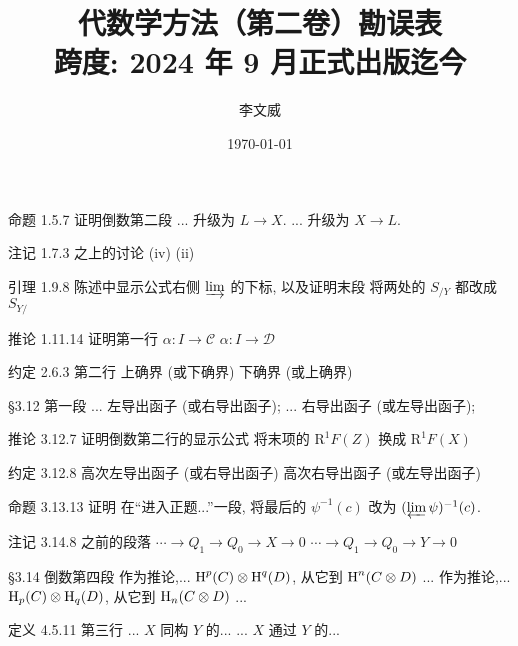 \documentclass{AJerrata}
\title{\bfseries 代数学方法（第二卷）勘误表 \\ 跨度: 2024 年 9 月正式出版迄今 }
\author{李文威}
\date{\today}
\begin{document}
	\maketitle

	\begin{Errata}
		\item[命题 1.5.7 证明倒数第二段]
		\Orig ... 升级为 $L \to X$.
		\Corr ... 升级为 $X \to L$.
		
		\item[注记 1.7.3 之上的讨论]
		\Orig (iv)
		\Corr (ii)
		
		\item[引理 1.9.8 陈述中显示公式右侧 $\varinjlim$ 的下标, 以及证明末段]
		将两处的 $S_{/Y}$ 都改成 $S_{Y/}$
		
		\item[推论 1.11.14 证明第一行]
		\Orig $\alpha: I \to \mathcal{C}$
		\Corr $\alpha: I \to \mathcal{D}$
		
		\item[约定 2.6.3 第二行]
		\Orig 上确界 (或下确界)
		\Corr 下确界 (或上确界)
		
		\item[\S 3.12 第一段]
		\Orig ... 左导出函子 (或右导出函子);
		\Corr ... 右导出函子 (或左导出函子);
		
		\item[推论 3.12.7 证明倒数第二行的显示公式]
		将末项的 $\mathrm{R}^1 F(Z)$ 换成 $\mathrm{R}^1 F(X)$
		
		\item[约定 3.12.8]
		\Orig 高次左导出函子 (或右导出函子)
		\Corr 高次右导出函子 (或左导出函子)
		
		\item[命题 3.13.13 证明]
		在``进入正题...''一段, 将最后的 $\psi^{-1}(c)$ 改为 $(\varprojlim \psi)^{-1}(c)$.
		
		\item[注记 3.14.8 之前的段落]
		\Orig $\cdots \to Q_1 \to Q_0 \to X \to 0$
		\Corr $\cdots \to Q_1 \to Q_0 \to Y \to 0$
		
		\item[\S 3.14 倒数第四段]
		\Orig 作为推论,... $\operatorname{H}^p(C) \otimes \operatorname{H}^q(D)$, 从它到 $\operatorname{H}^n(C \otimes D)$ ...
		\Corr 作为推论,... $\operatorname{H}_p(C) \otimes \operatorname{H}_q(D)$, 从它到 $\operatorname{H}_n(C \otimes D)$ ...
		
		\item[定义 4.5.11 第三行]
		\Orig ... $X$ 同构 $Y$ 的...
		\Corr ... $X$ 通过 $Y$ 的...
		

\end{Errata}
\end{document}
